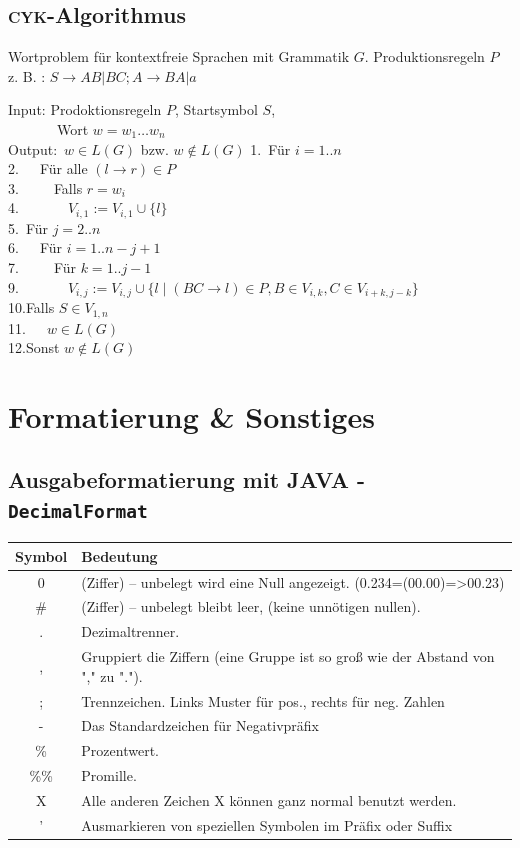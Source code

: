 \documentclass[10pt,a4paper,ngerman,oneside,]{article}
\begin{document}
\begin{multicols}{2}
\subsection{\textsc{cyk}-Algorithmus}
Wortproblem für kontextfreie Sprachen mit Grammatik $G$. Produktionsregeln $P$ z. B. : $S\to AB|BC; A\to BA|a$\\
\begin{flushleft}
\ttfamily 
Input: Prodoktionsregeln $P$, Startsymbol $S$, \\
~~~~~~~Wort $w=w_1\dots w_n$\\
Output:~$w\in L(G)$ bzw. $w\not\in L(G)$
1.~Für $i = 1..n$ \\
2.~~~Für alle $(l\to r)\in P$\\
3.~~~~~Falls $r = w_i$\\
4.~~~~~~~$V_{i,1}:= V_{i,1}\cup\{l\}$\\
5.~Für $j = 2..n$\\
6.~~~Für $i = 1.. n-j+1$\\
7.~~~~~Für $k=1..j-1$\\
9.~~~~~~~$V_{i,j} := V_{i,j}\cup\{l\mid (BC\to l)\in P, B\in V_{i,k}, C\in V_{i+k,j-k}\}$\\
10.Falls $S\in V_{1,n}$\\
11.~~~$w\in L(G)$\\
12.Sonst $w\not\in L(G)$\\ 
\end{flushleft}
\end{multicols}

\section{Formatierung \& Sonstiges}
\subsection{Ausgabeformatierung mit JAVA - \texttt{DecimalFormat}}
\begin{tabular}{cl}
Symbol & Bedeutung\\\hline
0 &	(Ziffer) – unbelegt wird eine Null angezeigt. (0.234=(00.00)=>00.23)\\
\# &	(Ziffer) – unbelegt bleibt leer, (keine unnötigen nullen).\\
. &	Dezimaltrenner. \\
, &	Gruppiert die Ziffern (eine Gruppe ist so groß wie der Abstand von "," zu ".").\\
; &	Trennzeichen. Links Muster für pos., rechts für neg. Zahlen\\
- &	Das Standardzeichen für Negativpräfix\\
\% &	Prozentwert.\\
\%\% &	Promille.\\
X &	Alle anderen Zeichen X können ganz normal benutzt werden.\\
' &	Ausmarkieren von speziellen Symbolen im Präfix oder Suffix \\
\end{tabular}
\end{document}
